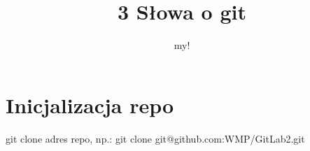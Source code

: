 \documentclass[12pt,a4paper]{report}
\author{my!}
\title{3 Słowa o git}
\begin{document}
\maketitle

\chapter{Inicjalizacja repo}
git clone adres repo, np.: git clone git@github.com:WMP/GitLab2.git
\end{document}
